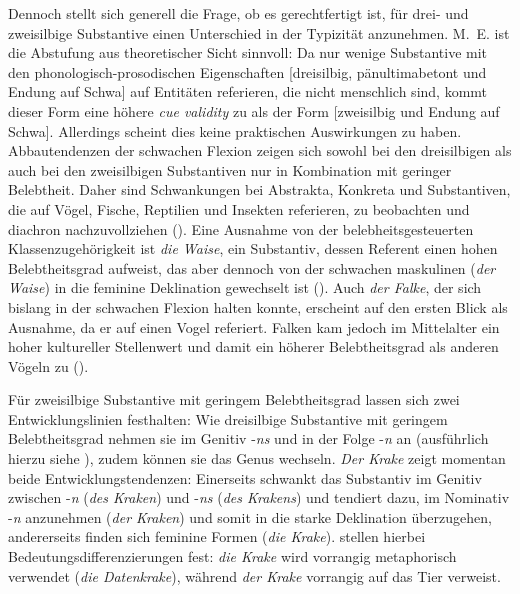 Dennoch stellt sich generell die Frage, ob es gerechtfertigt ist, für drei- und zweisilbige Substantive einen Unterschied in der Typizität anzunehmen. M.~E. ist die Abstufung aus theoretischer Sicht sinnvoll: Da nur wenige Substantive mit den phonologisch-prosodischen Eigenschaften [dreisilbig, pänultimabetont und Endung auf Schwa] auf Entitäten referieren, die nicht menschlich sind, kommt dieser Form eine höhere \textit{cue validity} zu als der Form [zweisilbig und Endung auf Schwa]. Allerdings scheint dies keine praktischen Auswirkungen zu haben. Abbautendenzen der schwachen Flexion zeigen sich sowohl bei den dreisilbigen als auch bei den zweisilbigen Substantiven nur in Kombination mit geringer Belebtheit. Daher sind Schwankungen bei Abstrakta, Konkreta und Substantiven, die auf Vögel, Fische, Reptilien und Insekten referieren, zu beobachten und diachron nachzuvollziehen (\cite[112--117]{Kopcke.2000}). Eine Ausnahme von der belebheitsgesteuerten Klassenzugehörigkeit ist \textit{die Waise}, ein Substantiv, dessen Referent einen hohen Belebtheitsgrad aufweist, das aber dennoch von der schwachen maskulinen (\textit{der Waise}) in die feminine Deklination gewechselt ist (\cite[116--117]{Kopcke.2000}). Auch \textit{der Falke}, der sich bislang in der schwachen Flexion halten konnte, erscheint auf den ersten Blick als Ausnahme, da er auf einen Vogel referiert. Falken kam jedoch im Mittelalter ein hoher kultureller Stellenwert und damit ein höherer Belebtheitsgrad als anderen Vögeln zu (\cite[112--113]{Kopcke.2000}).  

Für zweisilbige Substantive mit geringem Belebtheitsgrad lassen sich zwei Entwicklungslinien festhalten: Wie dreisilbige Substantive mit geringem Belebtheitsgrad nehmen sie im Genitiv -\textit{ns} und in der Folge -\textit{n} an (ausführlich hierzu siehe ), zudem können sie das Genus wechseln. \textit{Der Krake} zeigt momentan beide Entwicklungstendenzen: Einerseits schwankt das Substantiv im Genitiv zwischen -\textit{n} (\textit{des Kraken}) und -\textit{ns} (\textit{des Krakens}) und tendiert dazu, im Nominativ -\textit{n} anzunehmen (\textit{der Kraken}) und somit in die starke Deklination überzugehen, andererseits finden sich feminine Formen (\textit{die Krake}). \textcite[224--227]{Kopcke.2018} stellen hierbei Bedeutungsdifferenzierungen fest: \textit{die Krake} wird vorrangig metaphorisch verwendet (\textit{die Datenkrake}), während \textit{der Krake} vorrangig auf das Tier verweist. 

 



